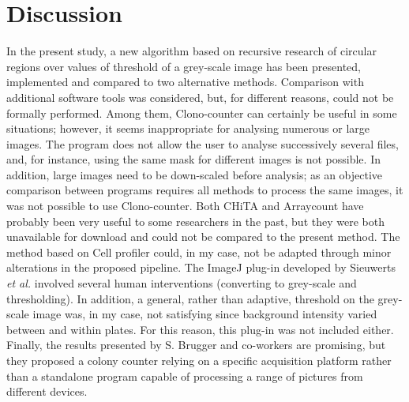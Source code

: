 \documentclass[10pt]{article}
\begin{document}
\section*{Discussion}
In the present study, a new algorithm based on recursive research of circular
regions over values of threshold of a grey-scale image has been presented, implemented and compared to two alternative methods\cite{clarke_lowcost_2010,cai_optimized_2011}. 
Comparison with additional software tools was considered, but, for different reasons, could not be formally performed.
Among them, Clono-counter \cite{niyazi_counting_2007}
can certainly be useful in some situations; however, it seems inappropriate for analysing numerous or large images.  
The program does not allow the user to analyse successively several files, and, for instance, using
the same mask for different images is not possible.
In addition, large images need to be down-scaled before analysis; 
as an objective comparison between programs requires all methods to process the same images,
it was not possible to use Clono-counter.
Both CHiTA\cite{bewes_automated_2008} and Arraycount\cite{kachouie_arraycount_2009} 
have probably been very useful to some researchers in the past, but
they were both unavailable for download and could not be compared to the present
method.
The method based on Cell profiler \cite {vokes_using_2008} could, in my case, not be adapted through minor
alterations in the proposed pipeline.
The ImageJ plug-in developed by Sieuwerts \emph{et al.} \cite{sieuwerts_simple_2008}
involved several human
interventions (converting to grey-scale and thresholding).
In addition, a general, rather than adaptive, threshold on the grey-scale image was, in my case, 
not satisfying since background intensity varied between and within plates.
For this reason, this plug-in was not included either.
Finally, the results presented by S. Brugger and co-workers \cite{brugger_automated_2012}
are promising, but they proposed a colony counter relying on a specific
acquisition platform rather than a standalone program capable of processing a range of 
pictures from different devices.
\end{document}
